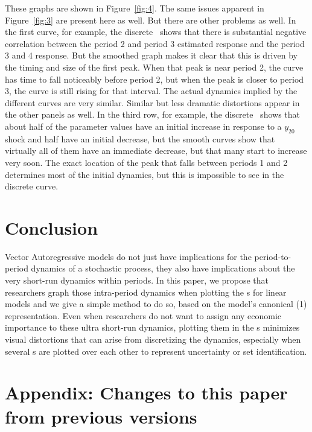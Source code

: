 \documentclass[12pt,fleqn]{article}
\begin{document}
These graphs are shown in Figure~\ref{fig:4}. The same issues apparent in
Figure~\ref{fig:3} are present here as well. But there are other problems
as well. In the first curve, for example, the discrete \IRF\ shows
that there is substantial negative correlation between the period 2
and period 3 estimated response and the period 3 and 4 response. But
the smoothed graph makes it clear that this is driven by the timing
and size of the first peak. When that peak is near period 2, the curve
has time to fall noticeably before period 2, but when the peak is
closer to period 3, the curve is still rising for that interval. The
actual dynamics implied by the different curves are very
similar. Similar but less dramatic distortions appear in the other
panels as well. In the third row, for example, the discrete \IRF\
shows that about half of the parameter values have an initial increase
in response to a $y_{20}$ shock and half have an initial decrease, but
the smooth curves show that virtually all of them have an immediate
decrease, but that many start to increase very soon. The exact
location of the peak that falls between periods 1 and 2 determines
most of the initial dynamics, but this is impossible to see in the
discrete curve.

\section{Conclusion}
\label{S4}

Vector Autoregressive models do not just have implications for the
period-to-period dynamics of a stochastic process, they also have
implications about the very short-run dynamics within periods. In this
paper, we propose that researchers graph those intra-period dynamics
when plotting the \IRF s for linear models and we give a simple method
to do so, based on the model's canonical \VAR(1) representation. Even
when researchers do not want to assign any economic importance to
these ultra short-run dynamics, plotting them in the \IRF s minimizes
visual distortions that can arise from discretizing the dynamics,
especially when several \IRF s are plotted over each other to
represent uncertainty or set identification.

\clearpage
{}


\clearpage
\appendix
\section{Appendix: Changes to this paper from previous versions}

\end{document}
